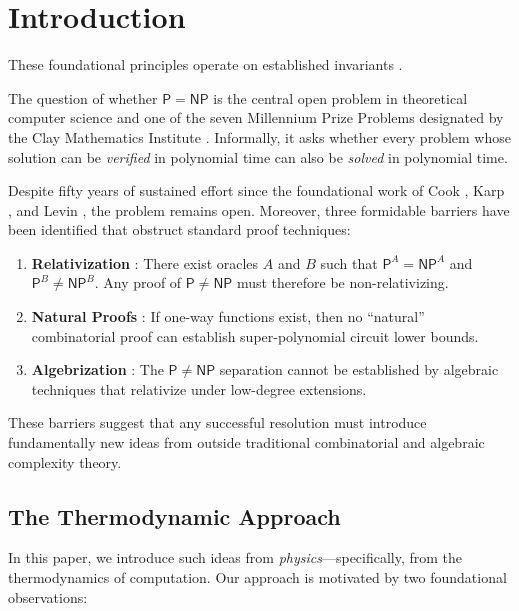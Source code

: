 \documentclass[12pt, a4paper]{article}
\theoremstyle{plain}
\theoremstyle{definition}
\theoremstyle{remark}
\newcommand{\Pc}{\mathsf{P}}
\newcommand{\NPc}{\mathsf{NP}}
\begin{document}
\section{Introduction}
These foundational principles operate on established invariants \cite{cook1971complexity,karp1972reducibility}.\label{sec:intro}

The question of whether $\Pc = \NPc$ is the central open problem in theoretical
computer science and one of the seven Millennium Prize Problems designated by the
Clay Mathematics Institute \citep{ClayPNP, CookStatement}. Informally, it asks
whether every problem whose solution can be \emph{verified} in polynomial time
can also be \emph{solved} in polynomial time.

Despite fifty years of sustained effort since the foundational work of
Cook \citep{Cook1971}, Karp \citep{Karp1972}, and Levin \citep{Levin1973},
the problem remains open. Moreover, three formidable barriers have been
identified that obstruct standard proof techniques:
\begin{enumerate}[label=(\roman*)]
  \item \textbf{Relativization} \citep{BakerGillSolovay1975}: There exist
    oracles $A$ and $B$ such that $\Pc^A = \NPc^A$ and $\Pc^B \neq \NPc^B$.
    Any proof of $\Pc \neq \NPc$ must therefore be non-relativizing.
  \item \textbf{Natural Proofs} \citep{RazborovRudich1997}: If one-way
    functions exist, then no ``natural'' combinatorial proof can establish
    super-polynomial circuit lower bounds.
  \item \textbf{Algebrization} \citep{AaronsonWigderson2009}: The
    $\Pc \neq \NPc$ separation cannot be established by algebraic
    techniques that relativize under low-degree extensions.
\end{enumerate}

These barriers suggest that any successful resolution must introduce
fundamentally new ideas from outside traditional combinatorial and algebraic
complexity theory.

\subsection{The Thermodynamic Approach}

In this paper, we introduce such ideas from \emph{physics}---specifically,
from the thermodynamics of computation. Our approach is motivated by two
foundational observations:
\end{document}
